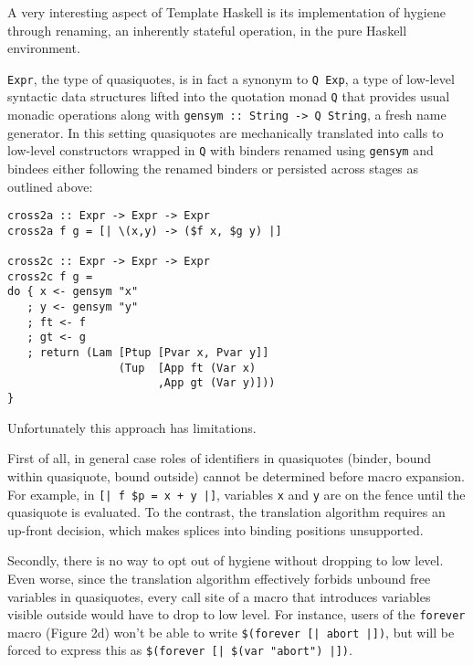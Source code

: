 \documentclass[10pt,journal,a4paper]{IEEEtran}
\begin{document}
A very interesting aspect of Template Haskell is its implementation of hygiene through renaming,
an inherently stateful operation, in the pure Haskell environment.

\small \texttt{Expr}\normalsize,
the type of quasiquotes, is in fact a synonym to \small \texttt{Q Exp}\normalsize,
a type of low-level syntactic data structures lifted into the quotation monad \small \texttt{Q} \normalsize
that provides usual monadic operations along with \small \texttt{gensym :: String -> Q String}\normalsize,
a fresh name generator.
In this setting quasiquotes are mechanically translated into calls to low-level constructors wrapped in
\small \texttt{Q} \normalsize with binders renamed using \small \texttt{gensym} \normalsize and bindees
either following the renamed binders or persisted across stages as outlined above:

\small
\begin{verbatim}
cross2a :: Expr -> Expr -> Expr
cross2a f g = [| \(x,y) -> ($f x, $g y) |]

cross2c :: Expr -> Expr -> Expr
cross2c f g =
do { x <- gensym "x"
   ; y <- gensym "y"
   ; ft <- f
   ; gt <- g
   ; return (Lam [Ptup [Pvar x, Pvar y]]
                 (Tup  [App ft (Var x)
                       ,App gt (Var y)]))
}
\end{verbatim}
\normalsize

Unfortunately this approach has limitations.

First of all, in general case roles
of identifiers in quasiquotes (binder, bound within quasiquote, bound outside) cannot be determined
before macro expansion. For example, in \small \texttt{[|~f~\$p~=~x~+~y~|]}\normalsize,
variables \small \texttt{x} \normalsize and \small \texttt{y} \normalsize are on the fence
until the quasiquote is evaluated. To the contrast, the translation algorithm requires an up-front decision,
which makes splices into binding positions unsupported.

Secondly, there is no way to opt out of hygiene without dropping to low level.
Even worse, since the translation algorithm effectively forbids unbound free variables in quasiquotes,
every call site of a macro that introduces variables visible outside would have to drop to low level.
For instance, users of the \small \texttt{forever} \normalsize macro (Figure 2d) won't be able to write
\small \texttt{\$(forever [| abort |])}\normalsize, but will be forced to express this as
\small \texttt{\$(forever [| \$(var "abort") |])}\normalsize.
\end{document}
